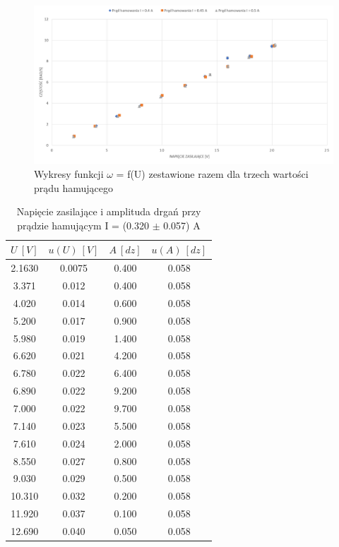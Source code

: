 \documentclass[12pt, a4paper, oneside]{article}
\begin{document}
\clearpage
\begin{figure}[h]
\centering
\caption{Wykresy funkcji $\omega$ = f(U) zestawione razem dla trzech wartości prądu hamującego}
\includegraphics[scale=0.34]{f7.png}
\end{figure}
\begin{table}[h]
  \centering
  \caption{Napięcie zasilające i amplituda drgań przy prądzie hamującym I = (0.320 $\pm$ 0.057) A}
    \begin{tabular}{|c|c|c|c|}\hline
    $U~[V]$ & $u(U)~[V]$ & $A~[dz]$ & $u(A)~[dz]$ \\\hline
    2.1630 & 0.0075 & 0.400 & 0.058 \\\hline
    3.371 & 0.012 & 0.400 & 0.058 \\\hline
    4.020 & 0.014 & 0.600 & 0.058 \\\hline
    5.200 & 0.017 & 0.900 & 0.058 \\\hline
    5.980 & 0.019 & 1.400 & 0.058 \\\hline
    6.620 & 0.021 & 4.200 & 0.058 \\\hline
    6.780 & 0.022 & 6.400 & 0.058 \\\hline
    6.890 & 0.022 & 9.200 & 0.058 \\\hline
    7.000 & 0.022 & 9.700 & 0.058 \\\hline
    7.140 & 0.023 & 5.500 & 0.058 \\\hline
    7.610 & 0.024 & 2.000 & 0.058 \\\hline
    8.550 & 0.027 & 0.800 & 0.058 \\\hline
    9.030 & 0.029 & 0.500 & 0.058 \\\hline
    10.310 & 0.032 & 0.200 & 0.058 \\\hline
    11.920 & 0.037 & 0.100 & 0.058 \\\hline
    12.690 & 0.040 & 0.050 & 0.058 \\\hline
    \end{tabular}%
  \label{tab:addlabel}%
\end{table}%
\end{document}
